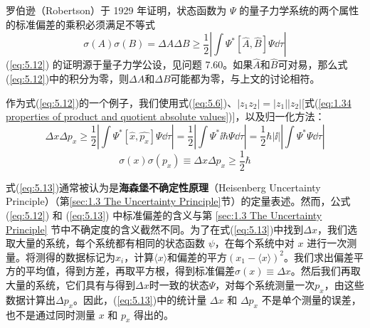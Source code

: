     罗伯逊（Robertson）于 1929 年证明，状态函数为 $\Psi$ 的量子力学系统的两个属性的标准偏差的乘积必须满足不等式
    \begin{equation}
        \sigma\left(A\right)\sigma\left(B\right) = \Delta A \Delta B \ge \frac{1}{2}\left|\int \Psi^{\ast}\left[\hat{A},\hat{B}\right]\Psi\dd \tau\right|
        \label{eq:5.12}
    \end{equation}
    (\ref{eq:5.12}) 的证明源于量子力学公设，见问题 7.60。如果$\hat{A}$和$\hat{B}$可对易，那么式(\ref{eq:5.12})中的积分为零，则$\Delta A$和$\Delta B$可能都为零，与上文的讨论相符。

    作为式(\ref{eq:5.12})的一个例子，我们使用式(\ref{eq:5.6})、$\left|z_1z_2\right|=\left|z_1\right|\left|z_2\right|$[式(\ref{eq:1.34 properties of product and quotient absolute values})]，以及归一化方法：
    \begin{equation*}
        \Delta x \Delta p_x \ge \frac{1}{2}\left|\int \Psi^{\ast}\left[\hat{x},\hat{p_x}\right]\Psi\dd \tau\right| = \frac{1}{2}\left|\int \Psi^{\ast}\ii \hbar\Psi\dd \tau\right| = \frac{1}{2}\hbar\left|\ii \right|\left|\int \Psi^{\ast}\Psi\dd \tau\right|
    \end{equation*}
    \begin{equation}
        \sigma\left(x\right)\sigma\left(p_x\right) \equiv \Delta x \Delta p_x \ge \frac{1}{2}\hbar
        \label{eq:5.13}
    \end{equation}

    式(\ref{eq:5.13})通常被认为是\textbf{海森堡不确定性原理}（Heisenberg Uncertainty Principle）（第\ref{sec:1.3 The Uncertainty Principle}节）的定量表述。然而，公式 (\ref{eq:5.12}) 和 (\ref{eq:5.13}) 中标准偏差的含义与第 \ref{sec:1.3 The Uncertainty Principle} 节中不确定度的含义截然不同。为了在式(\ref{eq:5.13})中找到$\Delta x$，我们选取大量的系统，每个系统都有相同的状态函数 $\psi$，在每个系统中对 $x$ 进行一次测量。将测得的数据标记为$x_i$，计算$\langle x \rangle$和偏差的平方$\left(x_1-\langle x \rangle\right)^2$。我们求出偏差平方的平均值，得到方差，再取平方根，得到标准偏差$\sigma\left(x\right)\equiv \Delta x$。然后我们再取大量的系统，它们具有与得到$\Delta x$时一致的状态$\Psi$，对每个系统测量一次$p_x$，由这些数据计算出$\Delta p_x$。因此，(\ref{eq:5.13})中的统计量 $\Delta x$ 和 $\Delta p_x$ 不是单个测量的误差，也不是通过同时测量 $x$ 和 $p_x$ 得出的。

